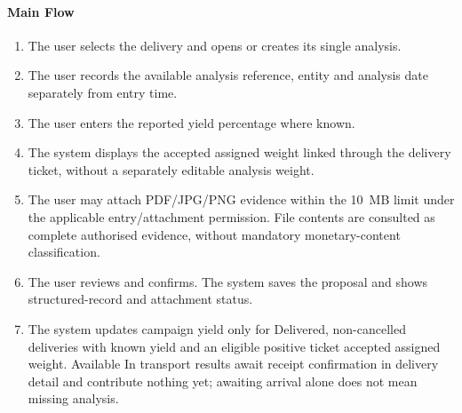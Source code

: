 \paragraph{Main Flow}
\begin{enumerate}
\item The user selects the delivery and opens or creates its single analysis.
\item The user records the available analysis reference, entity and analysis date separately from entry time.
\item The user enters the reported yield percentage where known.
\item The system displays the accepted assigned weight linked through the delivery ticket, without a separately editable analysis weight.
\item The user may attach PDF/JPG/PNG evidence within the 10~MB limit under the applicable entry/attachment permission. File contents are consulted as complete authorised evidence, without mandatory monetary-content classification.
\item The user reviews and confirms. The system saves the proposal and shows structured-record and attachment status.
\item The system updates campaign yield only for Delivered, non-cancelled deliveries with known yield and an eligible positive ticket accepted assigned weight. Available In transport results await receipt confirmation in delivery detail and contribute nothing yet; awaiting arrival alone does not mean missing analysis.
\end{enumerate}

